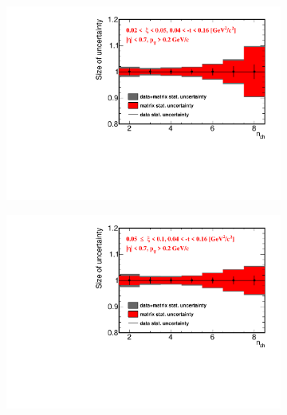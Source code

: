 \begin{figure}[h!]
	\centering
	\begin{subfigure}{.49\textwidth}
		\includegraphics[width=\textwidth,page=1]{chapters/chrgSTAR/img/unfolding/matrix_stat_0.pdf}
	\end{subfigure}
	\begin{subfigure}{.49\textwidth}
		\includegraphics[width=\textwidth,page=1]{chapters/chrgSTAR/img/unfolding/matrix_stat_1.pdf}
	\end{subfigure}
	\begin{subfigure}{.49\textwidth}

\end{subfigure}
\end{figure}
